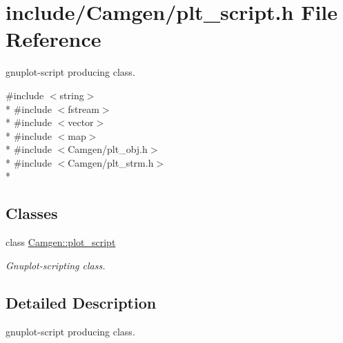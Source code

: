 \hypertarget{a00699}{\section{include/\-Camgen/plt\-\_\-script.h File Reference}
\label{a00699}
}


gnuplot-\/script producing class.  


{\ttfamily \#include $<$string$>$}\\*
{\ttfamily \#include $<$fstream$>$}\\*
{\ttfamily \#include $<$vector$>$}\\*
{\ttfamily \#include $<$map$>$}\\*
{\ttfamily \#include $<$Camgen/plt\-\_\-obj.\-h$>$}\\*
{\ttfamily \#include $<$Camgen/plt\-\_\-strm.\-h$>$}\\*
\subsection*{Classes}
\begin{DoxyCompactItemize}
\item 
class \hyperlink{a00426}{Camgen\-::plot\-\_\-script}
\begin{DoxyCompactList}\small\item\em Gnuplot-\/scripting class. \end{DoxyCompactList}\end{DoxyCompactItemize}


\subsection{Detailed Description}
gnuplot-\/script producing class. 